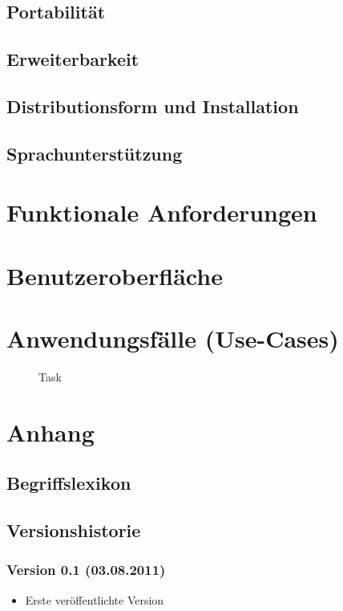 \documentclass[a4paper,10pt,titlepage]{article}
\newcommand{\usecase}[8]
{\subsection{#1}
\begin{tabular}{|p{0.2\textwidth}|p{0.7\textwidth}|}
\hline
  Akteur & #2\\\hline
  Ziel & #3\\\hline
  Vorbedingung & #4\\\hline
  Normalablauf & #7\\\hline
  Nachbedingung & #5\\\hline
  Sonderfall & #8\\\hline
  Nachbedingung im Sonderfall& #6\\\hline
 \end{tabular}
}
\newcommand{\begriff}[7]
{\subsection{#1}
\begin{tabular}{|p{0.2\textwidth}|p{0.7\textwidth}|}
\hline
  Bedeutung & #2\\\hline
  Abgrenzung & #3\\\hline
  Gültigkeit & #4\\\hline
  Bezeichnung & #5\\\hline
  Unklarheiten & #6\\\hline
  Querverweise & #7\\\hline
 \end{tabular}}
\begin{document}
\subsection{Portabilität}

\subsection{Erweiterbarkeit}

\subsection{Distributionsform und Installation}

\subsection{Sprachunterstützung}

\clearpage
\section{Funktionale Anforderungen}

\clearpage
\section{Benutzeroberfläche}


\clearpage
\section{Anwendungsfälle (Use-Cases)}
\begin{figure}[H]
  \centering
  \caption{Task}
\end{figure}



\clearpage
\appendix
\section{Anhang}

\subsection{Begriffslexikon}


\clearpage
\subsection{Versionshistorie}

	\subsubsection*{Version 0.1 (03.08.2011)}
	
	\begin{itemize}
		\item Erste veröffentlichte Version
	\end{itemize}
\end{document}
